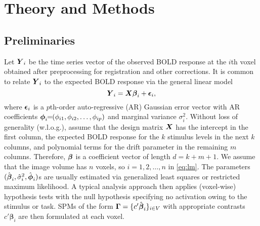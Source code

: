 \section{Theory and Methods} \label{sec:methodology}
\subsection{Preliminaries}\label{method:prelim}
Let $\boldsymbol{Y}_i$ be the time series vector of the observed BOLD response at
the $i$th voxel obtained after preprocessing for registration and
other corrections. It is  common to relate 
$\boldsymbol{Y}_i$ to the expected BOLD response via the general linear model
\begin{equation} 
  {\boldsymbol{Y}}_{i} = \boldsymbol{X}\boldsymbol{\beta}_i + \boldsymbol{\epsilon}_i,
  \label{eq:lm}
\end{equation}
where $\boldsymbol{\epsilon}_i$ is a $p$th-order auto-regressive (AR) Gaussian error
vector with AR coefficients $\boldsymbol{\phi}_i 
\!\!=\!\!(\phi_{i1},\phi_{i2},\ldots,\phi_{ip})$ and marginal variance
$\sigma_i^2$. Without loss of generality (w.l.o.g.), assume that the 
design matrix $\boldsymbol{X}$ has the intercept in the first column, the 
expected BOLD response for the $k$ stimulus levels in the next $k$
columns, and polynomial terms for the drift parameter in the remaining
$m$ columns. Therefore, $\boldsymbol{\beta}$ is a coefficient vector of length
$d\!=\!k\!+\!m\!+\!1$. We assume that the image volume has 
$n$ voxels, so $i\!=\!1,2,\ldots,n$ in \eqref{eq:lm}.
The parameters $(\hat{\boldsymbol{\beta}}_i,\hat\sigma_i^2,\hat{\boldsymbol{\phi}}_i)$s are
usually estimated via generalized least squares 
or restricted maximum likelihood. A typical analysis
approach then applies (voxel-wise) hypothesis tests with 
the null hypothesis specifying no activation owing to the stimulus or
task. SPMs of the form $\boldsymbol{\Gamma} =
\{c'\hat{\boldsymbol{\beta}}_i\}_{i \in V}$ with
appropriate contrasts 
$c'{\boldsymbol{\beta}}_i$ are then formulated at each voxel.

